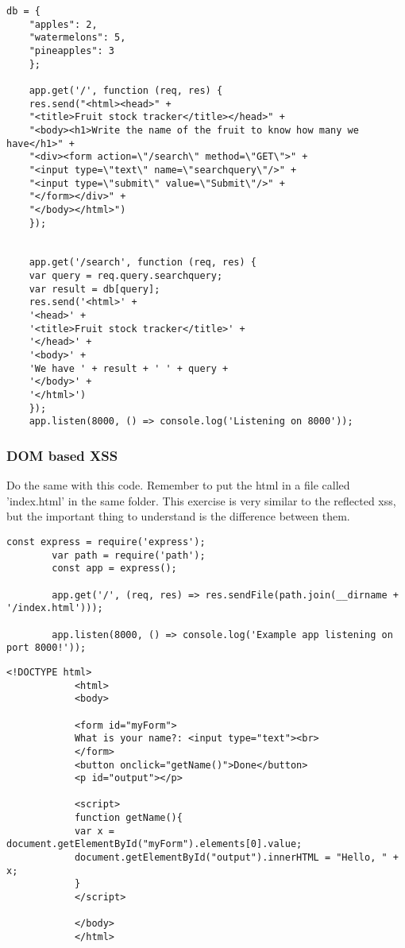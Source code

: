 \begin{Exercise}[label={websec-xss-types}]
\begin{lstlisting}[style=JavaScript]
	db = {
	"apples": 2,
	"watermelons": 5,
	"pineapples": 3
	};
	
	app.get('/', function (req, res) {
	res.send("<html><head>" +
	"<title>Fruit stock tracker</title></head>" +
	"<body><h1>Write the name of the fruit to know how many we have</h1>" +
	"<div><form action=\"/search\" method=\"GET\">" +
	"<input type=\"text\" name=\"searchquery\"/>" +
	"<input type=\"submit\" value=\"Submit\"/>" +
	"</form></div>" +
	"</body></html>")
	});
	
	
	app.get('/search', function (req, res) {
	var query = req.query.searchquery;
	var result = db[query];
	res.send('<html>' +
	'<head>' +
	'<title>Fruit stock tracker</title>' +
	'</head>' +
	'<body>' +
	'We have ' + result + ' ' + query +
	'</body>' +
	'</html>')
	});
	app.listen(8000, () => console.log('Listening on 8000'));
	\end{lstlisting}
	

	\subsubsection{DOM based XSS}
		Do the same with this code. Remember to put the html in a file called 'index.html' in the same folder. This exercise is very similar to the reflected xss, but the important thing to understand is the difference between them.
		\begin{lstlisting}[style=JavaScript]
		const express = require('express');
		var path = require('path');
		const app = express();
		
		app.get('/', (req, res) => res.sendFile(path.join(__dirname + '/index.html')));
		
		app.listen(8000, () => console.log('Example app listening on port 8000!'));
		\end{lstlisting}
		\begin{lstlisting}[style=JavaScript]
			<!DOCTYPE html>
			<html>
			<body>
			
			<form id="myForm">
			What is your name?: <input type="text"><br>
			</form>
			<button onclick="getName()">Done</button>
			<p id="output"></p>
			
			<script>
			function getName(){
			var x = document.getElementById("myForm").elements[0].value;
			document.getElementById("output").innerHTML = "Hello, " + x;
			}
			</script>
			
			</body>
			</html>
		\end{lstlisting}
\end{Exercise}
